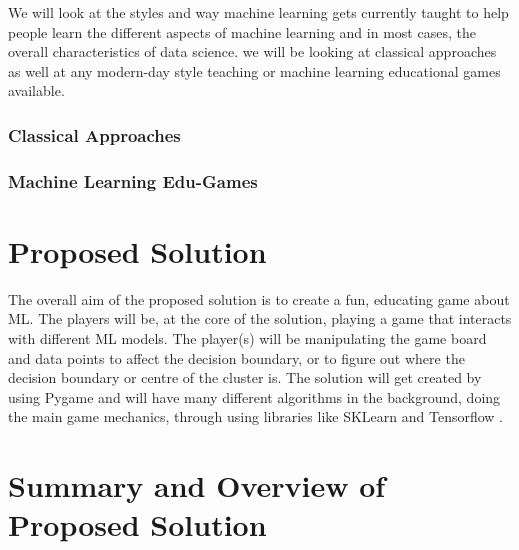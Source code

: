 	We will look at the styles and way machine learning gets currently taught to help people learn the different aspects of machine learning and in most cases, the overall characteristics of data science. we will be looking at classical approaches as well at any modern-day style teaching or machine learning educational games available. 
	
	\subsubsection{Classical Approaches}
		\label{sub_sec:classical_teach_learn}
	
	
	\subsubsection{Machine Learning Edu-Games}
		\label{sub_sec:ml_edu_games}
	
	\section{Proposed Solution}
	The overall aim of the proposed solution is to create a fun, educating game about ML. The players will be, at the core of the solution, playing a game that interacts with different ML models. The player(s) will be manipulating the game board and data points to affect the decision boundary, or to figure out where the decision boundary or centre of the cluster is. The solution will get created by using  Pygame and will have many different algorithms in the background, doing the main game mechanics, through using libraries like SKLearn \cite{sklearn_api} and Tensorflow \cite{tensorflow2015-whitepaper}.
	
	\section{Summary and Overview of Proposed Solution}
	